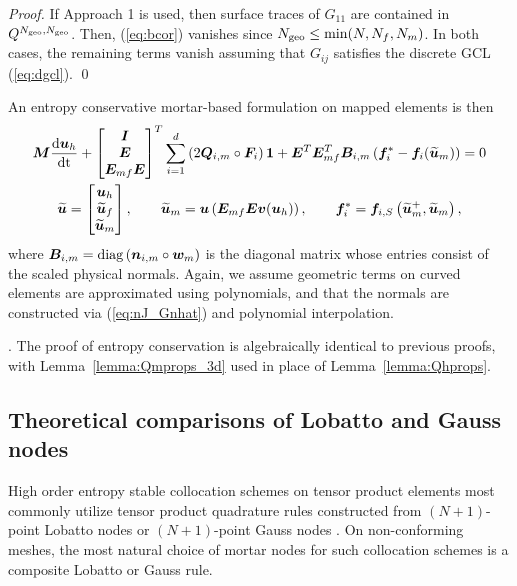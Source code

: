 \documentclass{svjour3}                     %
\renewcommand{\tilde}{\widetilde}
\newcommand{\diag}[1]{{\rm diag}\LRp{#1}}
\newcommand{\td}[2]{\frac{{\rm d}#1}{{\rm d}{\rm #2}}}
\newcommand{\LRp}[1]{\left( #1 \right)}
\renewcommand{\note}[1]{{\color{blue}{#1}}}
\begin{document}
\begin{proof}
If Approach 1 \cite{kopriva2006metric} is used, then surface traces of $G_{11}$ are contained in $Q^{N_{\rm geo},N_{\rm geo}}$.  Then, (\ref{eq:bcor}) vanishes since $N_{\rm geo} \leq \min(N,N_f,N_m)$.  In both cases, the remaining terms vanish assuming that $G_{ij}$ satisfies the discrete GCL (\ref{eq:dgcl}).
\qed\end{proof}


An entropy conservative mortar-based formulation on mapped elements is then 
\begin{gather}
{\bm{M}}\td{\bm{u}_h}{t} + \begin{bmatrix} \bm{I} \\ \bm{E} \\ \bm{E}_{mf}\bm{E} \end{bmatrix}^T
\sum_{i=1}^d \LRp{2{\bm{Q}}_{i,m} \circ \bm{F}_i}\bm{1} + \bm{E}^T\bm{E}_{mf}^T{\bm{B}}_{i,m}\LRp{\bm{f}_i^*-\bm{f}_i(\tilde{\bm{u}}_m)} = 0 \label{eq:esdgm}\\
\tilde{\bm{u}} = \begin{bmatrix}
\bm{u}_h\\
\tilde{\bm{u}}_f\\
\tilde{\bm{u}}_m
\end{bmatrix}, \qquad \tilde{\bm{u}}_m = \bm{u}\LRp{\bm{E}_{mf}\bm{E}\bm{v}(\bm{u}_h)}, \qquad \bm{f}^*_i = \bm{f}_{i,S}\LRp{\tilde{\bm{u}}_m^+,\tilde{\bm{u}}_m},
\end{gather}
where $\bm{B}_{i,m} = \diag{\bm{n}_{i,m}\circ \bm{w}_m}$ is the diagonal matrix whose entries consist of the scaled physical normals.  Again, we assume geometric terms on curved elements are approximated using polynomials, and that the normals are constructed via (\ref{eq:nJ_Gnhat}) and polynomial interpolation.  

\note{Add proof - include multi-element case}.
The proof of entropy conservation is algebraically identical to previous proofs, with Lemma~\ref{lemma:Qmprops_3d} used in place of Lemma~\ref{lemma:Qhprops}.


\subsection{Theoretical comparisons of Lobatto and Gauss nodes}

High order entropy stable collocation schemes on tensor product elements most commonly utilize tensor product quadrature rules constructed from $(N+1)$-point Lobatto nodes \cite{carpenter2014entropy, gassner2016split} or $(N+1)$-point Gauss nodes \cite{chan2018efficient}.  On non-conforming meshes, the most natural choice of mortar nodes for such collocation schemes is a composite Lobatto or Gauss rule.  
\end{document}
